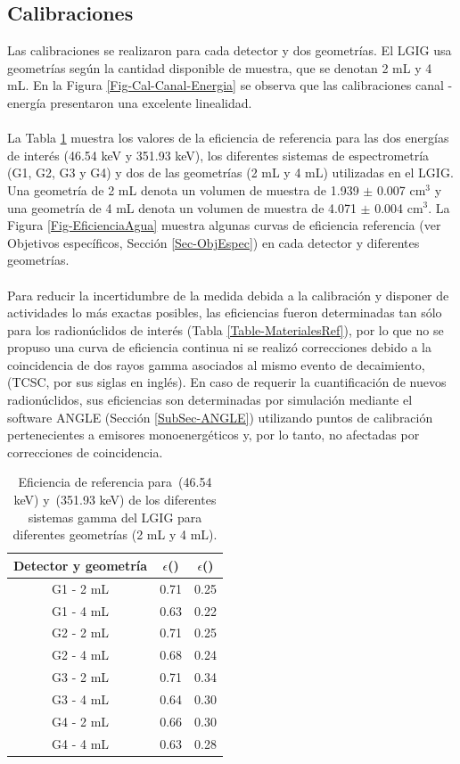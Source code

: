 		\subsection{Calibraciones}\label{SubSec-CaliChannel}
Las calibraciones se realizaron para cada detector y dos geometrías. El LGIG usa geometrías según la cantidad disponible de muestra, que se denotan 2 mL y 4 mL. En la Figura \ref{Fig-Cal-Canal-Energia} se observa que las calibraciones canal - energía presentaron una excelente linealidad. 
\\
\\
La Tabla \ref{Tabla-EficienciasPb} muestra los valores de la eficiencia de referencia para las dos energías de interés (46.54 keV y 351.93 keV), los diferentes sistemas de espectrometría (G1, G2, G3 y G4) y dos de las geometrías (2 mL y 4 mL) utilizadas en el LGIG. Una geometría de 2 mL denota un volumen de muestra de 1.939 $\pm$ 0.007 cm$^{3}$ y una geometría de 4 mL denota un volumen de muestra de 4.071 $\pm$ 0.004 cm$^{3}$. La Figura \ref{Fig-EficienciaAgua} muestra algunas curvas de eficiencia referencia (ver Objetivos específicos, Sección \ref{Sec-ObjEspec}) en cada detector y diferentes geometrías.
\\
\\
Para reducir la incertidumbre de la medida debida a la calibración y disponer de actividades lo más exactas posibles, las eficiencias fueron determinadas tan sólo para los radionúclidos de interés (Tabla \ref{Table-MaterialesRef}), por lo que no se propuso una curva de eficiencia continua ni se realizó correcciones debido a la coincidencia de dos rayos gamma asociados al mismo evento de decaimiento, (TCSC, por sus siglas en inglés). En caso de requerir la cuantificación de nuevos radionúclidos, sus eficiencias son determinadas por simulación mediante el software ANGLE (Sección \ref{SubSec-ANGLE}) utilizando puntos de calibración pertenecientes a emisores monoenergéticos y, por lo tanto, no afectadas por correcciones de coincidencia. 
\begin{table}[h]
\centering
\caption{Eficiencia de referencia para \PbCero\,(46.54 keV) y \PbCuatro\,(351.93 keV) de los diferentes sistemas gamma del LGIG para diferentes geometrías (2 mL y 4 mL).}\label{Tabla-EficienciasPb}
\begin{tabular}{|c|c|c|} \hline
\rowcolor{Blue2}	Detector y geometría & $\epsilon$(\PbCero) & $\epsilon$(\PbCuatro) \\ \hline
\rowcolor{Blue1}	G1 - 2 mL & 0.71 & 0.25 \\
\rowcolor{Blue1}	G1 - 4 mL & 0.63 & 0.22 \\
\rowcolor{Blue1}	G2 - 2 mL & 0.71 & 0.25 \\
\rowcolor{Blue1}	G2 - 4 mL & 0.68 & 0.24 \\
\rowcolor{Blue1}	G3 - 2 mL & 0.71 & 0.34 \\
\rowcolor{Blue1}	G3 - 4 mL & 0.64 & 0.30 \\
\rowcolor{Blue1}	G4 - 2 mL & 0.66 & 0.30 \\
\rowcolor{Blue1}	G4 - 4 mL & 0.63 & 0.28 \\ \hline
\end{tabular}
\end{table}
